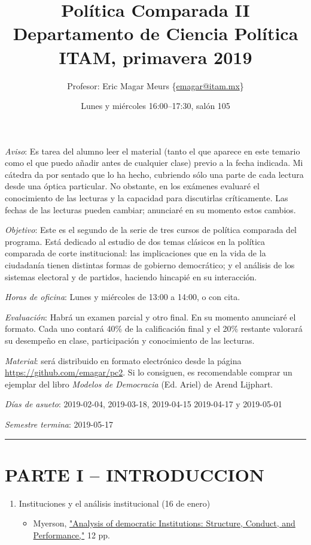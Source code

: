 \documentclass{article}
\author{Profesor: Eric Magar Meurs \small\{\url{emagar@itam.mx}\}}
\date{Lunes y miércoles 16:00--17:30, salón 105}
\title{Política Comparada II\\\medskip
\large Departamento de Ciencia Política ITAM, primavera 2019}
\begin{document}
\maketitle
\emph{Aviso}: Es tarea del alumno leer el material (tanto el que aparece en este temario como el que puedo añadir antes de cualquier clase) previo a la fecha indicada.  Mi cátedra da por sentado que lo ha hecho, cubriendo sólo una parte de cada lectura desde una óptica particular. No obstante, en los exámenes evaluaré el conocimiento de las lecturas y la capacidad para discutirlas críticamente. Las fechas de las lecturas pueden cambiar; anunciaré en su momento estos cambios.  

\emph{Objetivo}: Este es el segundo de la serie de tres cursos de política comparada del programa. Está dedicado al estudio de dos temas clásicos en la política comparada de corte institucional: las implicaciones que en la vida de la ciudadanía tienen distintas formas de gobierno democrático; y el análisis de los sistemas electoral y de partidos, haciendo hincapié en su interacción.  

\emph{Horas de oficina}: Lunes y miércoles de 13:00 a 14:00, o con cita. 

\emph{Evaluación}: Habrá un examen parcial y otro final. En su momento anunciaré el formato. Cada uno contará 40\% de la calificación final y el 20\% restante valorará su desempeño en clase, participación y conocimiento de las lecturas.

\emph{Material}: será distribuido en formato electrónico desde la página \url{https://github.com/emagar/pc2}. Si lo consiguen, es recomendable comprar un ejemplar del libro \emph{Modelos de Democracia} (Ed. Ariel) de Arend Lijphart. 

\emph{Días de asueto}: 2019-02-04, 2019-03-18, 2019-04-15 2019-04-17 y 2019-05-01

\emph{Semestre termina}: 2019-05-17

\noindent\rule{\textwidth}{0.5pt}

\section{PARTE I – INTRODUCCION}
\label{sec:orgcc54151}
\begin{enumerate}
\item Instituciones y el análisis institucional  (16 de enero)
\label{sec:org05e3ab7}
\begin{itemize}
\item Myerson, \href{https://github.com/emagar/pc2/blob/master/lecturas/myersonInstAnalysis1995jep.pdf}{"Analysis of democratic Institutions: Structure, Conduct, and Performance,"} 12 pp.
\end{itemize}
\end{enumerate}
\end{document}
